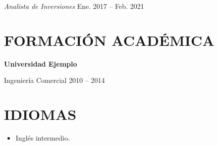 \documentclass[10pt,a4paper]{article}
\newcommand{\entidad}[2]{%
    \noindent
    \textbf{#1}\hfill
    {\small\color{secundario}#2}\par
}
\newcommand{\cargo}[2]{%
    \noindent
    \textit{#1}\hfill
    {\small\color{secundario}#2}\par
}
\newcommand{\programa}[2]{%
    \noindent
    #1\hfill
    {\small\color{secundario}#2}\par
}
\begin{document}
\vspace{3pt}

\cargo{Analista de Inversiones}{Ene. 2017 -- Feb. 2021}

\section{FORMACIÓN ACADÉMICA}

\entidad{Universidad Ejemplo}{}
\programa{Ingeniería Comercial}{2010 -- 2014}

\section{IDIOMAS}

\begin{itemize}
    \item Inglés intermedio.
\end{itemize}
\end{document}

